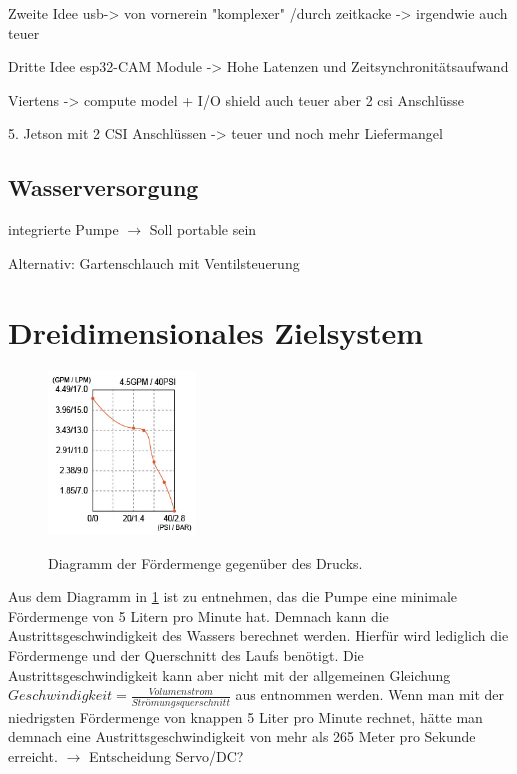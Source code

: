 Zweite Idee usb-> von vornerein "komplexer" /durch zeitkacke -> irgendwie auch teuer

Dritte Idee esp32-CAM Module -> Hohe Latenzen und Zeitsynchronitätsaufwand

Viertens -> compute model + I/O shield auch teuer aber 2 csi Anschlüsse

5. Jetson mit 2 CSI Anschlüssen -> teuer und noch mehr Liefermangel

\subsection{Wasserversorgung}

integrierte Pumpe $\rightarrow$ Soll portable sein

Alternativ: Gartenschlauch mit Ventilsteuerung



\section{Dreidimensionales Zielsystem} \label{cap:dreidim}

\begin{figure}
    \centering
    \includegraphics[width=0.35\textwidth]{images/seaflo_lpm_psi.png}
    \label{fig:psi_seaflo}
    \caption{Diagramm der Fördermenge gegenüber des Drucks. \cite{seaflo_pump}}
\end{figure}
Aus dem Diagramm in \ref{fig:psi_seaflo} ist zu entnehmen, das die Pumpe eine minimale Fördermenge von 5 Litern pro Minute hat. Demnach kann die Austrittsgeschwindigkeit des Wassers berechnet werden. Hierfür wird lediglich die Fördermenge und der Querschnitt des Laufs benötigt. Die Austrittsgeschwindigkeit kann aber nicht mit der allgemeinen Gleichung $ Geschwindigkeit = \frac{Volumenstrom}{Strömungsquerschnitt}
$ aus \cite{stroemungen} entnommen werden. 
Wenn man mit der niedrigsten Fördermenge von knappen 5 Liter pro Minute rechnet, hätte man demnach eine Austrittsgeschwindigkeit von mehr als 265 Meter pro Sekunde erreicht.
$\rightarrow$ Entscheidung Servo/DC?

